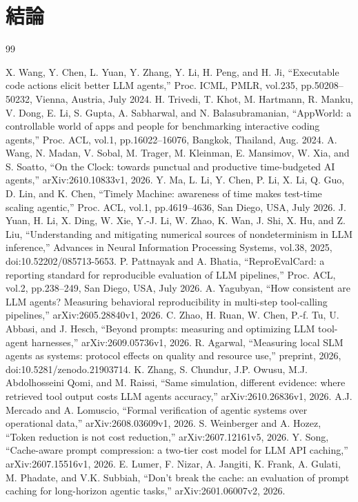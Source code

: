 \documentclass[letter]{ieicej}
\begin{document}
\section{結論}


\begin{thebibliography}{99}
\raggedright
{} X. Wang, Y. Chen, L. Yuan, Y. Zhang, Y. Li, H. Peng, and H. Ji, ``Executable code actions elicit better LLM agents,'' Proc. ICML, PMLR, vol.235, pp.50208--50232, Vienna, Austria, July 2024.
 H. Trivedi, T. Khot, M. Hartmann, R. Manku, V. Dong, E. Li, S. Gupta, A. Sabharwal, and N. Balasubramanian, ``AppWorld: a controllable world of apps and people for benchmarking interactive coding agents,'' Proc. ACL, vol.1, pp.16022--16076, Bangkok, Thailand, Aug. 2024.
 A. Wang, N. Madan, V. Sobal, M. Trager, M. Kleinman, E. Mansimov, W. Xia, and S. Soatto, ``On the Clock: towards punctual and productive time-budgeted AI agents,'' arXiv:2610.10833v1, 2026.
 Y. Ma, L. Li, Y. Chen, P. Li, X. Li, Q. Guo, D. Lin, and K. Chen, ``Timely Machine: awareness of time makes test-time scaling agentic,'' Proc. ACL, vol.1, pp.4619--4636, San Diego, USA, July 2026.
 J. Yuan, H. Li, X. Ding, W. Xie, Y.-J. Li, W. Zhao, K. Wan, J. Shi, X. Hu, and Z. Liu, ``Understanding and mitigating numerical sources of nondeterminism in LLM inference,'' Advances in Neural Information Processing Systems, vol.38, 2025, doi:10.52202/085713-5653.
 P. Pattnayak and A. Bhatia, ``ReproEvalCard: a reporting standard for reproducible evaluation of LLM pipelines,'' Proc. ACL, vol.2, pp.238--249, San Diego, USA, July 2026.
 A. Yagubyan, ``How consistent are LLM agents? Measuring behavioral reproducibility in multi-step tool-calling pipelines,'' arXiv:2605.28840v1, 2026.
 C. Zhao, H. Ruan, W. Chen, P.-f. Tu, U. Abbasi, and J. Hesch, ``Beyond prompts: measuring and optimizing LLM tool-agent harnesses,'' arXiv:2609.05736v1, 2026.
 R. Agarwal, ``Measuring local SLM agents as systems: protocol effects on quality and resource use,'' preprint, 2026, doi:10.5281/zenodo.21903714.
 K. Zhang, S. Chundur, J.P. Owusu, M.J. Abdolhosseini Qomi, and M. Raissi, ``Same simulation, different evidence: where retrieved tool output costs LLM agents accuracy,'' arXiv:2610.26836v1, 2026.
 A.J. Mercado and A. Lomuscio, ``Formal verification of agentic systems over operational data,'' arXiv:2608.03609v1, 2026.
 S. Weinberger and A. Hozez, ``Token reduction is not cost reduction,'' arXiv:2607.12161v5, 2026.
 Y. Song, ``Cache-aware prompt compression: a two-tier cost model for LLM API caching,'' arXiv:2607.15516v1, 2026.
 E. Lumer, F. Nizar, A. Jangiti, K. Frank, A. Gulati, M. Phadate, and V.K. Subbiah, ``Don't break the cache: an evaluation of prompt caching for long-horizon agentic tasks,'' arXiv:2601.06007v2, 2026.
\end{thebibliography}


\label{PreviewLastBodyPage}
\end{document}
